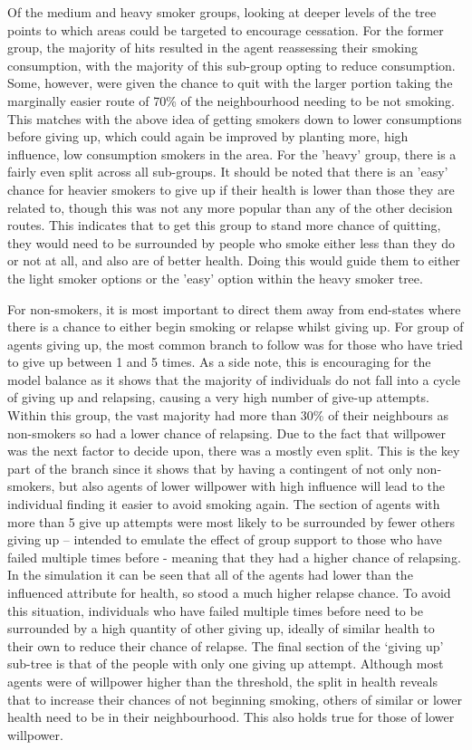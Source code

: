 \documentclass[]{report}
\begin{document}
Of the medium and heavy smoker groups, looking at deeper levels of the tree points to which areas could be targeted to encourage cessation. For the former group, the majority of hits resulted in the agent reassessing their smoking consumption, with the majority of this sub-group opting to reduce consumption. Some, however, were given the chance to quit with the larger portion taking the marginally easier route of 70\% of the neighbourhood needing to be not smoking. This matches with the above idea of getting smokers down to lower consumptions before giving up, which could again be improved by planting more, high influence, low consumption smokers in the area. For the 'heavy' group, there is a fairly even split across all sub-groups. It should be noted that there is an 'easy' chance for heavier smokers to give up if their health is lower than those they are related to, though this was not any more popular than any of the other decision routes. This indicates that to get this group to stand more chance of quitting, they would need to be surrounded by people who smoke either less than they do or not at all, and also are of better health. Doing this would guide them to either the light smoker options or the 'easy' option within the heavy smoker tree.

For non-smokers, it is most important to direct them away from end-states where there is a chance to either begin smoking or relapse whilst giving up. For group of agents giving up, the most common branch to follow was for those who have tried to give up between 1 and 5 times. As a side note, this is encouraging for the model balance as it shows that the majority of individuals do not fall into a cycle of giving up and relapsing, causing a very high number of give-up attempts. Within this group, the vast majority had more than 30\% of their neighbours as non-smokers so had a lower chance of relapsing. Due to the fact that willpower was the next factor to decide upon, there was a mostly even split. This is the key part of the branch since it shows that by having a contingent of not only non-smokers, but also agents of lower willpower with high influence will lead to the individual finding it easier to avoid smoking again. The section of agents with more than 5 give up attempts were most likely to be surrounded by fewer others giving up – intended to emulate the effect of group support to those who have failed multiple times before - meaning that they had a higher chance of relapsing. In the simulation it can be seen that all of the agents had lower than the influenced attribute for health, so stood a much higher relapse chance. To avoid this situation, individuals who have failed multiple times before need to be surrounded by a high quantity of other giving up, ideally of similar health to their own to reduce their chance of relapse. The final section of the `giving up' sub-tree is that of the people with only one giving up attempt. Although most agents were of willpower higher than the threshold, the split in health reveals that to increase their chances of not beginning smoking, others of similar or lower health need to be in their neighbourhood. This also holds true for those of lower willpower.
\end{document}
